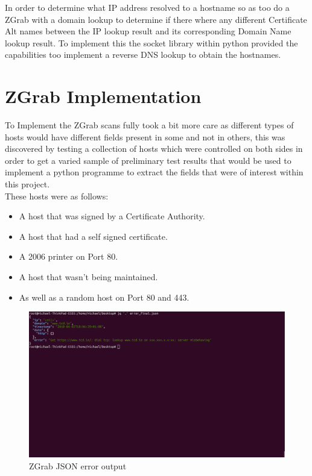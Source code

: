 \documentclass[a4wide,leqno,12pt]{report}
\begin{document}
In order to determine what IP address resolved to a hostname so as too do a ZGrab with a domain lookup to determine if there where any different Certificate Alt names between the IP lookup result and its corresponding Domain Name lookup result. To implement this the socket library within python provided the capabilities too implement a reverse DNS lookup to obtain the hostnames.\\


\section{ZGrab Implementation}
To Implement the ZGrab scans fully took a bit more care as different types of hosts would have different fields present in some and not in others, this was discovered by testing a collection of hosts which were controlled on both sides in order to get a varied sample of preliminary test results that would be used to implement a python programme to extract the fields that were of interest within this project.\\
These hosts were as follows:

\begin{itemize}
  \item A host that was signed by a Certificate Authority.
  \item A host that had a self signed certificate.
  \item A 2006 printer on Port 80.
  \item A host that wasn't being maintained.
  \item As well as a random host on Port 80 and 443.
\end{itemize}

\begin{figure}[H]
\centering
\includegraphics[scale=.3,trim={0 17cm 0 0},clip]{pdf_images/error_zgrab}
\caption{ZGrab JSON error output}
\label{fig:zgrab_error}
\end{figure}
\end{document}
